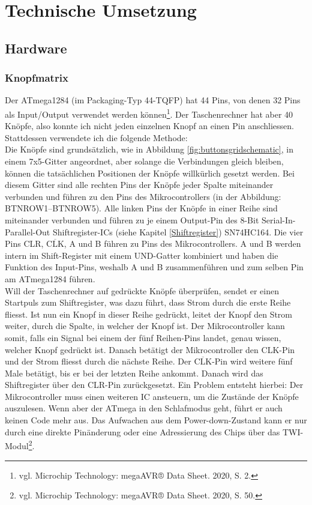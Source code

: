 \documentclass[12pt, a4paper]{report}
\begin{document}
\chapter{Technische Umsetzung}
\section{Hardware}
\subsection{Knopfmatrix}
Der ATmega1284 (im Packaging-Typ 44-TQFP) hat 44 Pins, von denen 32 Pins als Input/Output verwendet werden können\footnote{vgl. Microchip Technology: megaAVR® Data Sheet. 2020, S. 2.}. Der Taschenrechner hat aber 40 Knöpfe, also konnte ich nicht jeden einzelnen Knopf an einen Pin anschliessen. Stattdessen verwendete ich die folgende Methode:
\\[\medskipamount]
Die Knöpfe sind grundsätzlich, wie in Abbildung \ref{fig:buttonsgridschematic}, in einem 7x5-Gitter angeordnet, aber solange die Verbindungen gleich bleiben, können die tatsächlichen Positionen der Knöpfe willkürlich gesetzt werden. Bei diesem Gitter sind alle rechten Pins der Knöpfe jeder Spalte miteinander verbunden und führen zu den Pins des Mikrocontrollers (in der Abbildung: \textup{BTN\textunderscore ROW1--BTN\textunderscore ROW5}). Alle linken Pins der Knöpfe in einer Reihe sind miteinander verbunden und führen zu je einem Output-Pin des 8-Bit Serial-In-Parallel-Out Shiftregister-ICs (siehe Kapitel \ref{Shiftregister}) SN74HC164. Die vier Pins CLR, $\overline{\textrm{CLK}}$, A und B führen zu Pins des Mikrocontrollers. A und B werden intern im Shift-Register mit einem UND-Gatter kombiniert und haben die Funktion des Input-Pins, weshalb A und B zusammenführen und zum selben Pin am ATmega1284 führen.
\\[\medskipamount]
Will der Taschenrechner auf gedrückte Knöpfe überprüfen, sendet er einen Startpuls zum Shiftregister, was dazu führt, dass Strom durch die erste Reihe fliesst. Ist nun ein Knopf in dieser Reihe gedrückt, leitet der Knopf den Strom weiter, durch die Spalte, in welcher der Knopf ist. Der Mikrocontroller kann somit, falls ein Signal bei einem der fünf Reihen-Pins landet, genau wissen, welcher Knopf gedrückt ist. Danach betätigt der Mikrocontroller den CLK-Pin und der Strom fliesst durch die nächste Reihe. Der $\overline{\textrm{CLK}}$-Pin wird weitere fünf Male betätigt, bis er bei der letzten Reihe ankommt. Danach wird das Shiftregister über den CLR-Pin zurückgesetzt. Ein Problem entsteht hierbei: Der Mikrocontroller muss einen weiteren IC ansteuern, um die Zustände der Knöpfe auszulesen. Wenn aber der ATmega in den Schlafmodus geht, führt er auch keinen Code mehr aus. Das Aufwachen aus dem Power-down-Zustand kann er nur durch eine direkte Pinänderung oder eine Adressierung des Chips über das TWI-Modul\footnote{vgl. Microchip Technology: megaAVR® Data Sheet. 2020, S. 50.}.
\end{document}
